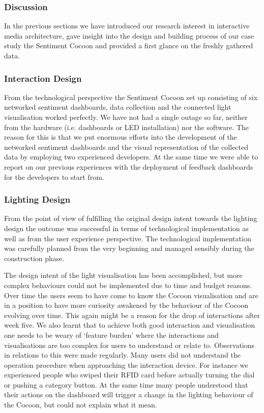 \subsubsection{Discussion}

In the previous sections we have introduced our research interest in interactive media architecture, gave insight into the design and building process of our case study the Sentiment Cocoon and provided a first glance on the freshly gathered data.

\subsubsection*{Interaction Design}

From the technological perspective the Sentiment Cocoon set up consisting of six networked sentiment dashboards, data collection and the connected light visualisation worked perfectly. We have not had a single outage so far, neither from the hardware (i.e. dashboards or LED installation) nor the software. The reason for this is that we put enormous efforts into the development of the networked sentiment dashboards and the visual representation of the collected data by employing two experienced developers. At the same time we were able to report on our previous experiences with the deployment of feedback dashboards for the developers to start from.  

\subsubsection*{Lighting Design}

From the point of view of fulfilling the original design intent towards the lighting design the outcome was successful in terms of technological implementation as well as from the user experience perspective. The technological implementation was carefully planned from the very beginning and managed sensibly during the construction phase. 

The design intent of the light visualisation has been accomplished, but more complex behaviours could not be implemented due to time and budget reasons. Over time the users seem to have come to know the Cocoon visualisation and are in a position to have more curiosity awakened by the behaviour of the Cocoon evolving over time. This again might be a reason for the drop of interactions after week five. We also learnt that to achieve both good interaction and visualisation one needs to be weary of ‘feature burden’ where the interactions and visualisations are too complex for users to understand or relate to. Observations in relations to this were made regularly. Many users did not understand the operation procedure when approaching the interaction device. For instance we experienced people who swiped their RFID card before actually turning the dial or pushing a category button. At the same time many people understood that their actions on the dashboard will trigger a change in the lighting behaviour of the Cocoon, but could not explain what it mean. 

